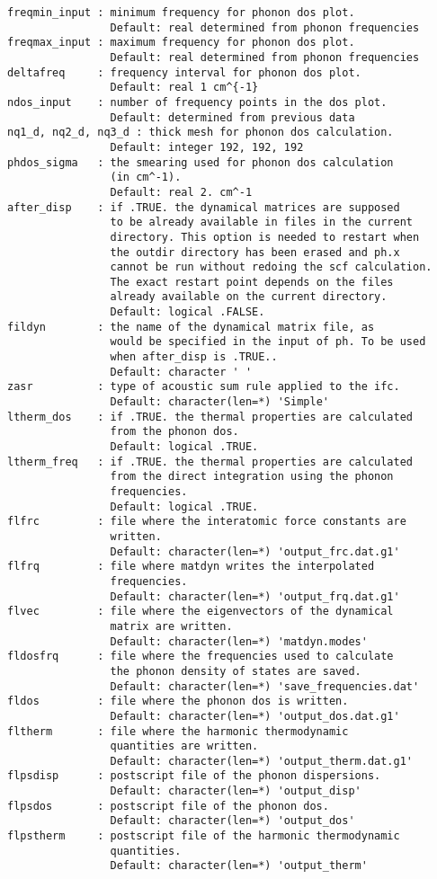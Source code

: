\documentclass[12pt,a4paper,twoside]{report}
\begin{document}
\begin{verbatim}
freqmin_input : minimum frequency for phonon dos plot.
                Default: real determined from phonon frequencies
freqmax_input : maximum frequency for phonon dos plot.
                Default: real determined from phonon frequencies
deltafreq     : frequency interval for phonon dos plot.
                Default: real 1 cm^{-1}
ndos_input    : number of frequency points in the dos plot.
                Default: determined from previous data
nq1_d, nq2_d, nq3_d : thick mesh for phonon dos calculation.
                Default: integer 192, 192, 192
phdos_sigma   : the smearing used for phonon dos calculation 
                (in cm^-1).
                Default: real 2. cm^-1
after_disp    : if .TRUE. the dynamical matrices are supposed 
                to be already available in files in the current 
                directory. This option is needed to restart when 
                the outdir directory has been erased and ph.x 
                cannot be run without redoing the scf calculation. 
                The exact restart point depends on the files 
                already available on the current directory.
                Default: logical .FALSE.
fildyn        : the name of the dynamical matrix file, as 
                would be specified in the input of ph. To be used 
                when after_disp is .TRUE.. 
                Default: character ' '
zasr          : type of acoustic sum rule applied to the ifc.
                Default: character(len=*) 'Simple'
ltherm_dos    : if .TRUE. the thermal properties are calculated 
                from the phonon dos.
                Default: logical .TRUE.
ltherm_freq   : if .TRUE. the thermal properties are calculated 
                from the direct integration using the phonon 
                frequencies.
                Default: logical .TRUE.
flfrc         : file where the interatomic force constants are 
                written.
                Default: character(len=*) 'output_frc.dat.g1'
flfrq         : file where matdyn writes the interpolated 
                frequencies.
                Default: character(len=*) 'output_frq.dat.g1'
flvec         : file where the eigenvectors of the dynamical 
                matrix are written.
                Default: character(len=*) 'matdyn.modes'
fldosfrq      : file where the frequencies used to calculate 
                the phonon density of states are saved.
                Default: character(len=*) 'save_frequencies.dat'
fldos         : file where the phonon dos is written.
                Default: character(len=*) 'output_dos.dat.g1'
fltherm       : file where the harmonic thermodynamic
                quantities are written.
                Default: character(len=*) 'output_therm.dat.g1'
flpsdisp      : postscript file of the phonon dispersions.
                Default: character(len=*) 'output_disp'
flpsdos       : postscript file of the phonon dos.
                Default: character(len=*) 'output_dos'
flpstherm     : postscript file of the harmonic thermodynamic 
                quantities.
                Default: character(len=*) 'output_therm'
\end{verbatim}
\end{document}
